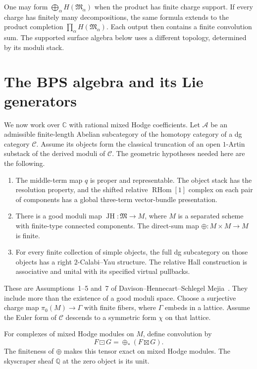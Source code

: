 One may form $\bigoplus_\alpha H(\mathfrak M_\alpha)$ when the product has finite charge support.
If every charge has finitely many decompositions, the same formula extends to the product completion $\prod_\alpha H(\mathfrak M_\alpha)$.
Each output then contains a finite convolution sum.
The supported surface algebra below uses a different topology, determined by its moduli stack.

\section{The BPS algebra and its Lie generators}
We now work over $\mathbb C$ with rational mixed Hodge coefficients.
Let $\mathcal A$ be an admissible finite-length Abelian subcategory of the homotopy category of a dg category $\mathcal C$.
Assume its objects form the classical truncation of an open $1$-Artin substack of the derived moduli of $\mathcal C$.
The geometric hypotheses needed here are the following.

\begin{enumerate}
\item The middle-term map $q$ is proper and representable.
The object stack has the resolution property, and the shifted relative $\operatorname{RHom}[1]$ complex on each pair of components has a global three-term vector-bundle presentation.
\item There is a good moduli map $\operatorname{JH}:\mathfrak M\to M$, where $M$ is a separated scheme with finite-type connected components.
The direct-sum map $\oplus:M\times M\to M$ is finite.
\item For every finite collection of simple objects, the full dg subcategory on those objects has a right $2$-Calabi--Yau structure.
The relative Hall construction is associative and unital with its specified virtual pullbacks.
\end{enumerate}
These are Assumptions~1--5 and~7 of Davison--Hennecart--Schlegel Mejia~\cite[\S\S4,6]{DHS}.
They include more than the existence of a good moduli space.
Choose a surjective charge map $\pi_0(M)\to\Gamma$ with finite fibers, where $\Gamma$ embeds in a lattice.
Assume the Euler form of $\mathcal C$ descends to a symmetric form $\chi$ on that lattice.

For complexes of mixed Hodge modules on $M$, define convolution by
\[
 F\boxdot G=\oplus_*(F\boxtimes G).
\]
The finiteness of $\oplus$ makes this tensor exact on mixed Hodge modules.
The skyscraper sheaf $\mathbb Q$ at the zero object is its unit.


